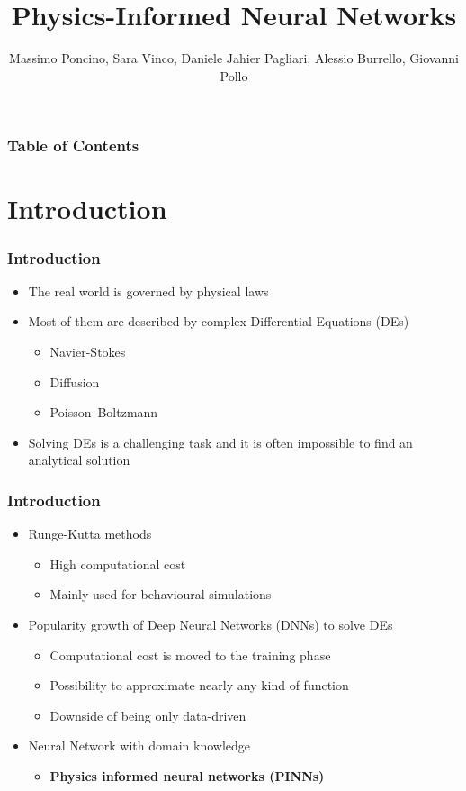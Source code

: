 \documentclass{beamer}
\title{Physics-Informed Neural Networks}
\author[Giovanni Pollo]{Massimo Poncino\inst{1}, Sara Vinco\inst{1}, Daniele Jahier Pagliari\inst{1}, Alessio Burrello\inst{1,}\inst{2}, Giovanni Pollo\inst{1}}
\institute[Politecnico di Torino] %
{
  \inst{1}%
  Politecnico di Torino
  \and
  \inst{2}%
  Alma Mater Studiorum - Università di Bologna
}
\begin{document}
\frame{\titlepage}
\begin{frame}
  \frametitle{Table of Contents}
  \tableofcontents
\end{frame}

\section{Introduction}
\begin{frame}
  \frametitle{Introduction}
  \begin{itemize}
    \item The real world is governed by physical laws
    \item Most of them are described by complex Differential Equations (DEs)
    \begin{itemize}
      \item Navier-Stokes
      \item Diffusion
      \item Poisson–Boltzmann
    \end{itemize}
    \item Solving DEs is a challenging task and it is often impossible to find an analytical solution
  \end{itemize}
\end{frame}

\begin{frame}
  \frametitle{Introduction}
  \begin{itemize}
    \item Runge-Kutta methods
    \begin{itemize}
      \item High computational cost
      \item Mainly used for behavioural simulations
    \end{itemize}
    \item Popularity growth of Deep Neural Networks (DNNs) to solve DEs \cite{deep-neural-network-for-system-of-ordinary-differential-equations-vectorized-algorithm-and-simulation}
    \begin{itemize}
      \item Computational cost is moved to the training phase
      \item Possibility to approximate nearly any kind of function
      \item Downside of being only data-driven
    \end{itemize}
      \item Neural Network with domain knowledge
      \begin{itemize}
        \item \textbf{Physics informed neural networks (PINNs)} 
      \end{itemize}
  \end{itemize}
\end{frame}
\end{document}
